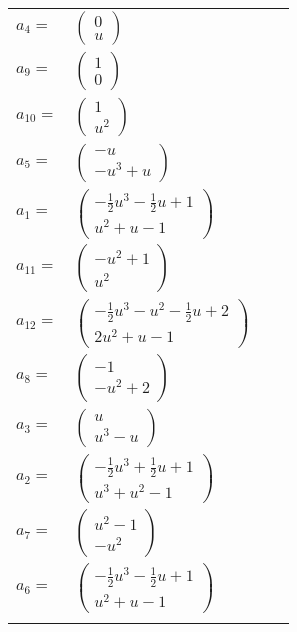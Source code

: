 \documentclass[1p]{elsarticle_modified}
\theoremstyle{definition}
\begin{document}
\begin{tabular}{m{7pt} m{180pt} m{7pt} m{180pt} }
\flushright $a_{4}=$&$\begin{pmatrix}0\\u\end{pmatrix}$ \\
\flushright $a_{9}=$&$\begin{pmatrix}1\\0\end{pmatrix}$ \\
\flushright $a_{10}=$&$\begin{pmatrix}1\\u^2\end{pmatrix}$ \\
\flushright $a_{5}=$&$\begin{pmatrix}- u\\- u^3+u\end{pmatrix}$ \\
\flushright $a_{1}=$&$\begin{pmatrix}-\frac{1}{2} u^3-\frac{1}{2} u+1\\u^2+u-1\end{pmatrix}$ \\
\flushright $a_{11}=$&$\begin{pmatrix}- u^2+1\\u^2\end{pmatrix}$ \\
\flushright $a_{12}=$&$\begin{pmatrix}-\frac{1}{2} u^3- u^2-\frac{1}{2} u+2\\2 u^2+u-1\end{pmatrix}$ \\
\flushright $a_{8}=$&$\begin{pmatrix}-1\\- u^2+2\end{pmatrix}$ \\
\flushright $a_{3}=$&$\begin{pmatrix}u\\u^3- u\end{pmatrix}$ \\
\flushright $a_{2}=$&$\begin{pmatrix}-\frac{1}{2} u^3+\frac{1}{2} u+1\\u^3+u^2-1\end{pmatrix}$ \\
\flushright $a_{7}=$&$\begin{pmatrix}u^2-1\\- u^2\end{pmatrix}$ \\
\flushright $a_{6}=$&$\begin{pmatrix}-\frac{1}{2} u^3-\frac{1}{2} u+1\\u^2+u-1\end{pmatrix}$\\&\end{tabular}
\end{document}
